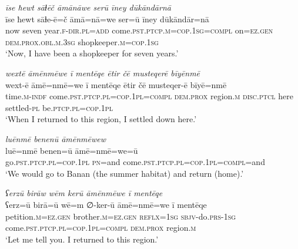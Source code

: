 \ea \label{ŽM.8}
\textit{īse ħewt sāɫēč āmānāwe serū īney dūkāndārnā} \\ 
\gll īse ħewt sāɫe-ē=č āmā=nā=we ser=ū īney dūkāndār=nā \\ 
 now seven year\textsc{.f}\textsc{-dir}\textsc{.pl}\textsc{=add} come\textsc{.pst}\textsc{.ptcp}\textsc{.m}\textsc{=cop}\textsc{.\textsc{1sg}}\textsc{=compl} on\textsc{=ez.gen} \textsc{dem.prox}\textsc{.obl}\textsc{.m}\textsc{.3sg} shopkeeper\textsc{.m}\textsc{=cop}\textsc{.\textsc{1sg}} \\ 
\glt `Now, I have been a shopkeeper for seven years.'
\z 
 
\ea \label{ŽM.51}
\textit{wextē āmēnmēwe ī mentēqe ētir čē musteqerē bīyēnmē} \\ 
\gll wext-ē āmē=nmē=we ī mentēqe ētir čē musteqer-ē bīyē=nmē \\ 
 time\textsc{.m}\textsc{-indf} come\textsc{.pst}\textsc{.ptcp}\textsc{.pl}\textsc{=cop}\textsc{.\textsc{1pl}}\textsc{=compl} \textsc{dem.prox} region\textsc{.m} \textsc{disc}.\textsc{ptcl} here settled\textsc{\textsc{-pl}} be\textsc{.ptcp}\textsc{.pl}\textsc{=cop}\textsc{.\textsc{1pl}} \\ 
\glt `When I returned to this region, I settled down here.'
\z 
 
\ea \label{ŽM.52}
\textit{luēnmē benenū āmēnmēwew} \\ 
\gll luē=nmē benen=ū āmē=nmē=we=ū \\ 
 go\textsc{.pst}\textsc{.ptcp}\textsc{.pl}\textsc{=cop}\textsc{.\textsc{1pl}} \textsc{pn}=and come\textsc{.pst}\textsc{.ptcp}\textsc{.pl}\textsc{=cop}\textsc{.\textsc{1pl}}\textsc{=compl}=and \\ 
\glt `We would go to Banan (the summer habitat) and return (home).'
\z 
 
\ea \label{ŽM.53}
\textit{ʕerzū birāw wēm kerū āmēnmēwe ī mentēqe} \\ 
\gll ʕerz=ū birā=ū wē=m ∅-ker-ū āmē=nmē=we ī mentēqe \\ 
 petition\textsc{.m}\textsc{=ez.gen} brother\textsc{.m}\textsc{=ez.gen} \textsc{reflx}\textsc{=\textsc{1sg}} \textsc{sbjv-}do\textsc{.prs}\textsc{-\textsc{1sg}} come\textsc{.pst}\textsc{.ptcp}\textsc{.pl}\textsc{=cop}\textsc{.\textsc{1pl}}\textsc{=compl} \textsc{dem.prox} region\textsc{.m} \\ 
\glt `Let me tell you. I returned to this region.'
\z 
 

